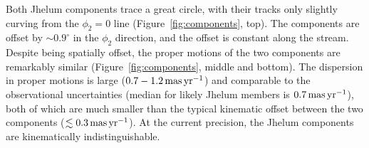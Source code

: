 \documentclass[twocolumn]{aastex62}
\begin{document}
Both Jhelum components trace a great circle, with their tracks only slightly curving from the $\phi_2=0$ line (Figure~\ref{fig:components}, top).
The components are offset by $\sim0.9^\circ$ in the $\phi_2$ direction, and the offset is constant along the stream.
Despite being spatially offset, the proper motions of the two components are remarkably similar (Figure~\ref{fig:components}, middle and bottom).
The dispersion in proper motions is large ($0.7-1.2\,\rm mas\,yr^{-1}$) and comparable to the observational uncertainties (median for likely Jhelum members is $0.7\rm\, mas\, yr^{-1}$), both of which are much smaller than the typical kinematic offset between the two components ($\lesssim0.3\,\rm mas\,yr^{-1}$).
At the current precision, the Jhelum components are kinematically indistinguishable.
\end{document}
